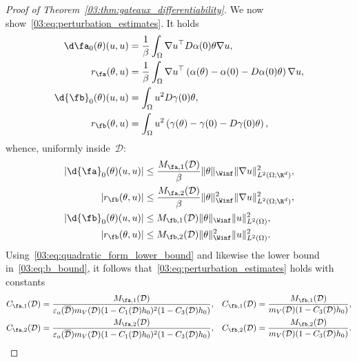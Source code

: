 \begin{proof}[Proof of Theorem~\ref{03:thm:gateaux_differentiability}]
    We now show~\eqref{03:eq:perturbation_estimates}. It holds
    \begin{equation}
        \begin{aligned}
            \d \fa_0(\theta)(u,u) &= \frac1\beta\int_\Omega \nabla u^\top D\alpha(0)\theta \nabla u,\\
            r_{\fa}(\theta,u) &= \frac1\beta \int_{\Omega} \nabla u^\top\left(\alpha(\theta) - \alpha(0) - D\alpha(0)\theta\right)\nabla u,\\
            \d {\fb}_0(\theta)(u,u) &= \int_\Omega u^2 D\gamma(0)\theta,\\
            r_{\fb}(\theta,u) &= \int_\Omega u^2 \left(\gamma(\theta)-\gamma(0)-D\gamma(0)\theta\right),
        \end{aligned}
    \end{equation}
    whence, uniformly inside~$\mathcal D$:
    \begin{equation}
        \begin{aligned}
            |\d {\fa}_0(\theta)(u,u)| &\leq \frac{M_{{\fa},1}(\mathcal D)}{\beta}\|\theta\|_{\Winf}\|\nabla u\|^2_{L^2(\Omega;\R^d)},\\
            |r_{\fb}(\theta,u)| & \leq\frac{M_{{\fa},2}(\mathcal D)}{\beta}\|\theta\|^2_{\Winf}\|\nabla u\|^2_{L^2(\Omega;\R^d)},\\
            |\d {\fb}_0(\theta)(u,u)| & \leq M_{{\fb},1}(\mathcal D)\|\theta\|_{\Winf}\|u\|^2_{L^2(\Omega)},\\
            |r_{\fb}(\theta,u)|&\leq M_{{\fb},2}(\mathcal D)\|\theta\|_{\Winf}^2\|u\|^2_{L^2(\Omega)}.
        \end{aligned}
    \end{equation}
    Using~\eqref{03:eq:quadratic_form_lower_bound} and likewise the lower bound in~\eqref{03:eq:b_bound}, it follows that~\eqref{03:eq:perturbation_estimates} holds with constants
    \begin{equation}
        \begin{aligned}
            C_{{\fa},1}(\mathcal D) &= \frac{M_{{\fa},1}(\mathcal D)}{\varepsilon_a(\overline{\mathcal D}) m_V(\mathcal D)(1-C_1(\mathcal D)h_0)^2(1-C_3(\mathcal D)h_0)},&C_{{\fb},1}(\mathcal D) &= \frac{M_{{\fb},1}(\mathcal D)}{m_V(\mathcal D)(1-C_3(\mathcal D)h_0)},\\
            C_{{\fa},2}(\mathcal D) &= \frac{M_{{\fa},2}(\mathcal D)}{\varepsilon_a(\overline{\mathcal D}) m_V(\mathcal D)(1-C_1(\mathcal D)h_0)^2(1-C_3(\mathcal D)h_0)},&C_{{\fb},2}(\mathcal D) &= \frac{M_{{\fb},2}(\mathcal D)}{m_V(\mathcal D)(1-C_3(\mathcal D)h_0)}.
        \end{aligned}
    \end{equation}


\end{proof}
